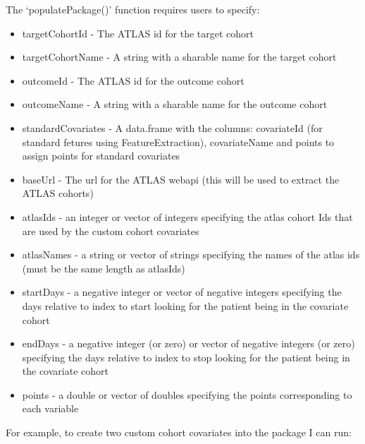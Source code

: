 \documentclass[
]{article}
\providecommand{\tightlist}{%
  \setlength{\itemsep}{0pt}\setlength{\parskip}{0pt}}
\begin{document}
The `populatePackage()' function requires users to specify:

\begin{itemize}
\tightlist
\item
  targetCohortId - The ATLAS id for the target cohort
\item
  targetCohortName - A string with a sharable name for the target cohort
\item
  outcomeId - The ATLAS id for the outcome cohort
\item
  outcomeName - A string with a sharable name for the outcome cohort
\item
  standardCovariates - A data.frame with the columns: covariateId (for
  standard fetures using FeatureExtraction), covariateName and points to
  assign points for standard covariates
\item
  baseUrl - The url for the ATLAS webapi (this will be used to extract
  the ATLAS cohorts)
\item
  atlasIds - an integer or vector of integers specifying the atlas
  cohort Ids that are used by the custom cohort covariates
\item
  atlasNames - a string or vector of strings specifying the names of the
  atlas ids (must be the same length as atlasIds)
\item
  startDays - a negative integer or vector of negative integers
  specifying the days relative to index to start looking for the patient
  being in the covariate cohort
\item
  endDays - a negative integer (or zero) or vector of negative integers
  (or zero) specifying the days relative to index to stop looking for
  the patient being in the covariate cohort
\item
  points - a double or vector of doubles specifying the points
  corresponding to each variable
\end{itemize}

For example, to create two custom cohort covariates into the package I
can run:
\end{document}
